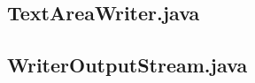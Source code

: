 \documentclass[a4paper, 12pt]{article}
\begin{document}
\subsection{TextAreaWriter.java}\label{taw}
\begin{footnotesize}

\end{footnotesize}
\newpage

\subsection{WriterOutputStream.java}\label{wos}
\begin{footnotesize}

\end{footnotesize}
\end{document}
